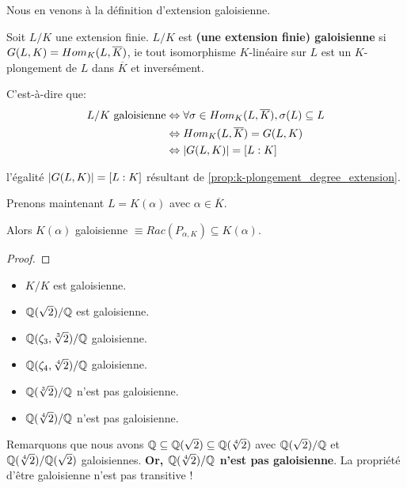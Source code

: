 Nous en venons à la définition d'extension galoisienne.

\begin{definition}
	Soit $L/K$ une extension finie.
	$L/K$ est \textbf{(une extension finie) galoisienne} si $G(L, K) =
	Hom_{K}(L, \overline{K})$, ie tout isomorphisme $K$-linéaire sur $L$
	est un $K$-plongement de $L$ dans $\overline{K}$ et inversément.
\end{definition}

C'est-à-dire que:
\begin{align*}
	L/K \text{ galoisienne}
	& \Leftrightarrow \forall \sigma \in Hom_{K}(L, \overline{K}), \sigma(L) \subseteq L \\
	& \Leftrightarrow Hom_{K}(L, \overline{K}) = G(L, K) \\
	& \Leftrightarrow |G(L, K)| = [L : K]
\end{align*}

l'égalité $|G(L, K)| = [L : K]$ résultant
de \ref{prop:k-plongement_degree_extension}.

\begin{proposition}
	Prenons maintenant $L = K(\alpha)$ avec $\alpha \in \overline{K}$.

	Alors $K(\alpha)$ galoisienne $\equiv Rac(P_{\alpha, K}) \subseteq K(\alpha)$.
\end{proposition}

\ifdefined\outputproof
\begin{proof}

\end{proof}
\fi

\begin{exemple} [Exercice]
	\begin{itemize}
		\item $K/K$ est galoisienne.
		\item $\mathbb{Q}(\sqrt{2})/\mathbb{Q}$ est galoisienne.
		\item $\mathbb{Q}(\zeta_{3}, \sqrt[3]{2})/\mathbb{Q}$ galoisienne.
		\item $\mathbb{Q}(\zeta_{4}, \sqrt[4]{2})/\mathbb{Q}$ galoisienne.
		\item $\mathbb{Q}(\sqrt[3]{2})/\mathbb{Q}$ n'est pas galoisienne.
		\item $\mathbb{Q}(\sqrt[4]{2})/\mathbb{Q}$ n'est pas galoisienne.
	\end{itemize}
\end{exemple}

Remarquons que nous avons $\mathbb{Q} \subseteq \mathbb{Q}(\sqrt{2}) \subseteq
\mathbb{Q}(\sqrt[4]{2})$ avec $\mathbb{Q}(\sqrt{2})/\mathbb{Q}$ et
$\mathbb{Q}(\sqrt[4]{2})/\mathbb{Q}(\sqrt{2})$ galoisiennes.
\textbf{Or, $\mathbb{Q}(\sqrt[4]{2})/\mathbb{Q}$ n'est pas galoisienne}. La
propriété d'être galoisienne n'est pas transitive !

